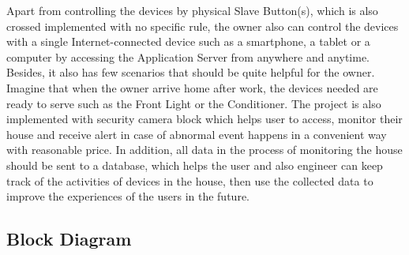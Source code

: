     Apart from controlling the devices by physical Slave Button(s), which is also crossed implemented with no specific rule, the owner also can control the devices with a single Internet-connected device such as a smartphone, a tablet or a computer by accessing the Application Server from anywhere and anytime. Besides, it also has few scenarios that should be quite helpful for the owner. Imagine that when the owner arrive home after work, the devices needed are ready to serve such as the Front Light or the Conditioner. The project is also implemented with security camera block which helps user to access, monitor their house and receive alert in case of abnormal event happens in a convenient way with reasonable price. In addition, all data in the process of monitoring the house should be sent to a database, which helps the user and also engineer can keep track of the activities of devices in the house, then use the collected data to improve the experiences of the users in the future.

    \subsection{Block Diagram}

